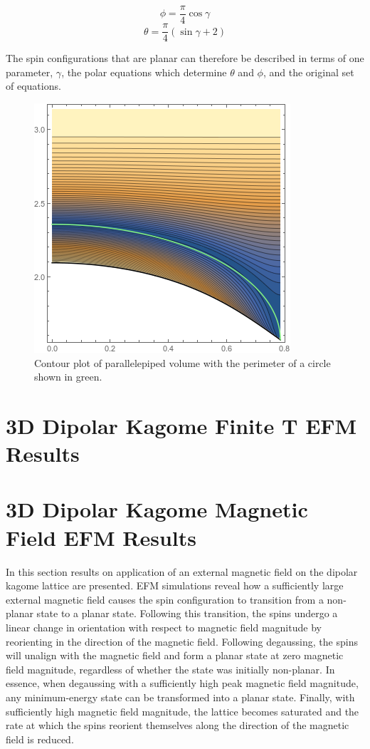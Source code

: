 \begin{equation}
\phi = \frac{\pi}{4}\cos{\gamma} 
\end{equation}
\begin{equation}
\theta = \frac{\pi}{4}(\sin{\gamma}+2)
\end{equation}

The spin configurations that are planar can therefore be described in terms of one parameter, $\gamma$, the polar equations which determine $\theta$ and $\phi$, and the original set of equations.  

\begin{figure}[h]
\includegraphics[width=.5\linewidth]{img/groundstatevol_withplanarborder.png} 
    \caption{Contour plot of parallelepiped volume with the perimeter of a circle shown in green.} 
\end{figure}
\clearpage
\section{3D Dipolar Kagome Finite T EFM Results}


\section{3D Dipolar Kagome Magnetic Field EFM Results}

In this section results on application of an external magnetic field on the dipolar kagome lattice are presented. EFM simulations reveal how a sufficiently large external magnetic field causes the spin configuration to transition from a non-planar state to a planar state. Following this transition, the spins undergo a linear change in orientation with respect to magnetic field magnitude by reorienting in the direction of the magnetic field. Following degaussing, the spins will unalign with the magnetic field and form a planar state at zero magnetic field magnitude, regardless of whether the state was initially non-planar. In essence, when degaussing with a sufficiently high peak magnetic field magnitude, any minimum-energy state can be transformed into a planar state. Finally, with sufficiently high magnetic field magnitude, the lattice becomes saturated and the rate at which the spins reorient themselves along the direction of the magnetic field is reduced. 

